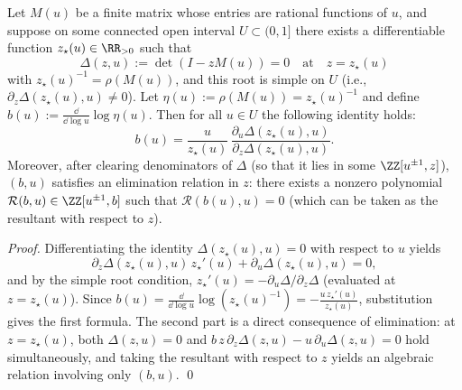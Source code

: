 \begin{proposition}\label{prop:gut-beta-determinant-ratio}
Let \(M(u)\) be a finite matrix whose entries are rational functions of \(u\), and suppose on some connected open interval \(U\subset(0,1]\) there exists a differentiable function \(z_\star(u)\in\RR_{>0}\) such that
\[
\Delta(z,u):=\det(I-zM(u))=0\quad\text{at}\quad z=z_\star(u)
\]
with \(z_\star(u)^{-1}=\rho(M(u))\), and this root is simple on \(U\) (i.e., \(\partial_z\Delta(z_\star(u),u)\neq 0\)).
Let \(\eta(u):=\rho(M(u))=z_\star(u)^{-1}\) and define
\(
b(u):=\frac{\dd}{\dd\log u}\log\eta(u)
\).
Then for all \(u\in U\) the following identity holds:
\[
b(u)=\frac{u}{z_\star(u)}\,
\frac{\partial_u\Delta(z_\star(u),u)}{\partial_z\Delta(z_\star(u),u)}.
\]
Moreover, after clearing denominators of \(\Delta\) (so that it lies in some \(\ZZ[u^{\pm1},z]\)), \((b,u)\) satisfies an elimination relation in \(z\): there exists a nonzero polynomial
\(
\mathcal{R}(b,u)\in\ZZ[u^{\pm1},b]
\)
such that \(\mathcal{R}(b(u),u)=0\) (which can be taken as the resultant with respect to \(z\)).
\end{proposition}

\begin{proof}
Differentiating the identity \(\Delta(z_\star(u),u)=0\) with respect to \(u\) yields
\[
\partial_z\Delta(z_\star(u),u)\,z_\star'(u)+\partial_u\Delta(z_\star(u),u)=0,
\]
and by the simple root condition,
\(
z_\star'(u)=-\partial_u\Delta/\partial_z\Delta
\)
(evaluated at \(z=z_\star(u)\)).
Since
\(
b(u)=\frac{\dd}{\dd\log u}\log(z_\star(u)^{-1})=-\frac{u\,z_\star'(u)}{z_\star(u)}
\),
substitution gives the first formula.
The second part is a direct consequence of elimination: at \(z=z_\star(u)\), both
\(
\Delta(z,u)=0
\)
and
\(
b\,z\,\partial_z\Delta(z,u)-u\,\partial_u\Delta(z,u)=0
\)
hold simultaneously, and taking the resultant with respect to \(z\) yields an algebraic relation involving only \((b,u)\). \qed
\end{proof}

